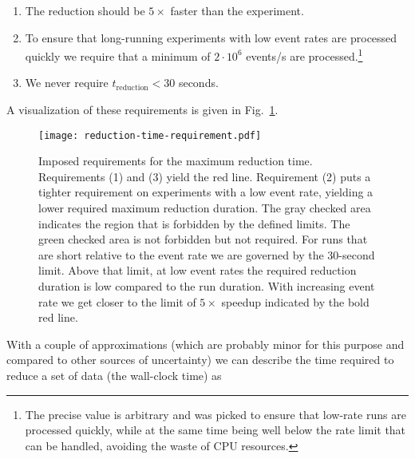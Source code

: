 \documentclass[a4paper,english,numbers=noenddot,bibliography=totoc,chapterprefix=on,DIV=12]{scrartcl}
\newcommand{\Treduction}{t_{\text{reduction}}}
\begin{document}
\begin{enumerate}
  \item The reduction should be $5\times$ faster than the experiment.
  \item To ensure that long-running experiments with low event rates are processed quickly we require that a minimum of $2\cdot10^6$ events/s are processed.\footnote{The precise value is arbitrary and was picked to ensure that low-rate runs are processed quickly, while at the same time being well below the rate limit that can be handled, avoiding the waste of CPU resources.}
  \item We never require $\Treduction < 30$ seconds.
\end{enumerate}
A visualization of these requirements is given in Fig.~\ref{fig:reduction-time-requirement}.

\begin{figure}
  \centering
\texttt{[image: reduction-time-requirement.pdf]}
\caption{\label{fig:reduction-time-requirement}
Imposed requirements for the maximum reduction time.
Requirements (1) and (3) yield the red line.
Requirement (2) puts a tighter requirement on experiments with a low event rate, yielding a lower required maximum reduction duration.
The gray checked area indicates the region that is forbidden by the defined limits.
The green checked area is not forbidden but not required.
For runs that are short relative to the event rate we are governed by the 30-second limit.
Above that limit, at low event rates the required reduction duration is low compared to the run duration.
With increasing event rate we get closer to the limit of $5\times$ speedup indicated by the bold red line.}
\end{figure}

With a couple of approximations (which are probably minor for this purpose and compared to other sources of uncertainty) we can describe the time required to reduce a set of data (the wall-clock time) as
\end{document}
